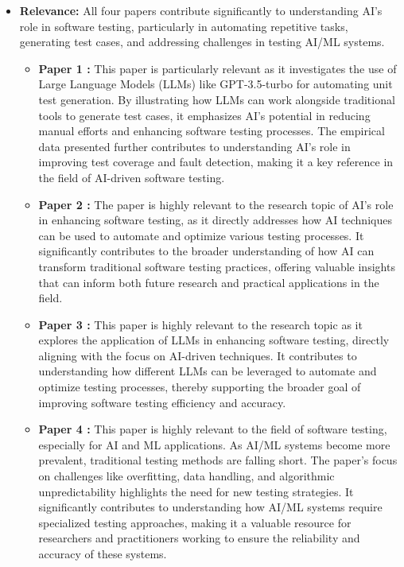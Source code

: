 \documentclass[12pt,a4paper]{article}
\begin{document}
\begin{itemize}
\begin{itemize}
\begin{itemize}
        \end{itemize}
        \item \textbf{Relevance: }
            All four papers contribute significantly to understanding AI’s role in software testing, particularly in automating repetitive tasks, generating test cases, and addressing challenges in testing AI/ML systems.
        \begin{itemize}
            \item \textbf{Paper 1 :} This paper is particularly relevant as it investigates the use of Large Language Models (LLMs) like GPT-3.5-turbo for automating unit test generation. By illustrating how LLMs can work alongside traditional tools to generate test cases, it emphasizes AI’s potential in reducing manual efforts and enhancing software testing processes. The empirical data presented further contributes to understanding AI’s role in improving test coverage and fault detection, making it a key reference in the field of AI-driven software testing.
            
            \item \textbf{Paper 2 :} The paper is highly relevant to the research topic of AI's role in enhancing software testing, as it directly addresses how AI techniques can be used to automate and optimize various testing processes. It significantly contributes to the broader understanding of how AI can transform traditional software testing practices, offering valuable insights that can inform both future research and practical applications in the field.

            \item \textbf{Paper 3 :} This paper is highly relevant to the research topic as it explores the application of LLMs in enhancing software testing, directly aligning with the focus on AI-driven techniques. It contributes to understanding how different LLMs can be leveraged to automate and optimize testing processes, thereby supporting the broader goal of improving software testing efficiency and accuracy.

            \item \textbf{Paper 4 :} This paper is highly relevant to the field of software testing, especially for AI and ML applications. As AI/ML systems become more prevalent, traditional testing methods are falling short. The paper’s focus on challenges like overfitting, data handling, and algorithmic unpredictability highlights the need for new testing strategies. It significantly contributes to understanding how AI/ML systems require specialized testing approaches, making it a valuable resource for researchers and practitioners working to ensure the reliability and accuracy of these systems.
            
        \end{itemize}
    \end{itemize}


\end{itemize}
\end{document}
